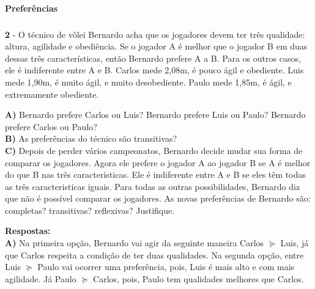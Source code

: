 \documentclass[a4paper, 12pt]{article} %
\begin{document}
\begin{flushleft}
\begin{center}
\end{center}

\paragraph{Preferências}

\subparagraph{}
\textbf{2} - O técnico de vôlei Bernardo acha que os jogadores devem ter três qualidade: altura, agilidade e obediência. Se o jogador A é melhor que o jogador B em duas dessas três características, então Bernardo prefere A a B. Para os outros casos, ele é indiferente entre A e B. Carlos mede 2,08m, é pouco ágil e obediente. Luis mede 1,90m, é muito ágil, e muito desobediente. Paulo mede 1,85m, é ágil, e extremamente obediente.
\singlespacing

\textbf{A)} Bernardo prefere Carlos ou Luis? Bernardo prefere Luis ou Paulo? Bernardo prefere Carlos ou Paulo?
\\
\textbf{B)} As preferências do técnico são transitivas?
\\
\textbf{C)} Depois de perder vários campeonatos, Bernardo decide mudar sua forma de comparar os jogadores. Agora ele prefere o jogador A ao jogador B se A é melhor do que B nas três caracteristicas. Ele é indiferente entre A e B se eles têm todas as três caracteristicas iguais. Para todas as outras possibilidades, Bernardo diz que não é possível comparar os jogadores. As novas preferências de Bernardo são: completas? transitivas? reflexivas? Justifique.

\singlespacing

\textbf{Respostas:}
\\
\textbf{A)} Na primeira opção, Bernardo vai agir da seguinte maneira Carlos $\succeq$ Luis, já que Carlos respeita a condição de ter duas qualidades. Na segunda opção, entre Luis $\succeq$  Paulo vai ocorrer uma preferência, pois, Luis é mais alto e com mais agilidade. Já Paulo $\succeq$ Carlos, pois, Paulo tem qualidades melhores que Carlos. \singlespacing


\end{flushleft}
\end{document}

